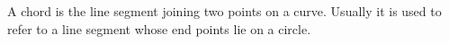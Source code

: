 \documentclass[12pt]{article}
\begin{document}
A chord is the line segment joining two points on a curve. 
Usually it is used to refer to a line segment whose end points lie on a circle.
\end{document}
